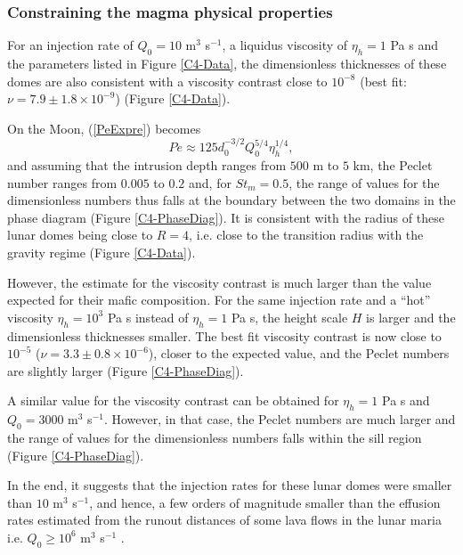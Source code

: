 \subsubsection*{Constraining the magma physical properties}
\label{C4-sec:constr-magma-phys}

For  an  injection  rate  of $Q_0=10$  m$^{3}$  s$^{-1}$,  a  liquidus
viscosity of  $\eta_h= 1$  Pa s  and the  parameters listed  in Figure
\ref{C4-Data},  the dimensionless  thicknesses of  these domes  are also
consistent with  a viscosity  contrast close  to $10^{-8}$  (best fit:
$\nu=7.9 \pm 1.8 \times 10^{-9}$) (Figure \ref{C4-Data}).  

On the Moon, (\ref{PeExpre}) becomes
\begin{equation}
  Pe \approx 125 d_0^{-3/2} Q_0^{5/4}\eta_h^{1/4},
  \label{PeExpreMoon}
\end{equation}
and assuming that  the intrusion depth ranges from $500$  m to $5$ km,
the Peclet  number ranges from  $0.005$ to $0.2$ and,  for $St_m=0.5$,
the range  of values for the  dimensionless numbers thus falls  at the
boundary  between  the  two  domains  in  the  phase  diagram  (Figure
\ref{C4-PhaseDiag}).  It is consistent with  the radius of these lunar
domes being close to $R=4$, i.e.   close to the transition radius with
the gravity regime (Figure \ref{C4-Data}).  

However, the estimate  for the viscosity contrast is  much larger than
the  value  expected  for  their  mafic  composition.   For  the  same
injection rate and  a ``hot'' viscosity $\eta_h=10^3$ Pa  s instead of
$\eta_h=1$ Pa s, the height scale  $H$ is larger and the dimensionless
thicknesses smaller.  The best  fit viscosity contrast  is now  close to
$10^{-5}$ ($\nu = 3.3 \pm  0.8 \times10^{-6}$), closer to the expected
value,   and  the   Peclet   numbers  are   slightly  larger   (Figure
\ref{C4-PhaseDiag}).  

A  similar  value for  the  viscosity  contrast  can be  obtained  for
$\eta_h=1$ Pa s and $Q_0=3000$ m$^3$ s$^{-1}$.  However, in that case,
the Peclet  numbers are much  larger and the  range of values  for the
dimensionless   numbers  falls   within   the   sill  region   (Figure
\ref{C4-PhaseDiag}).

In the end, it suggests that the injection rates for these lunar domes
were smaller  than $10$ m$^{3}$ s$^{-1}$,  and hence, a few  orders of
magnitude smaller  than the effusion  rates estimated from  the runout
distances of  some lava flows in  the lunar maria i.e.   $Q_0\ge 10^6$
m$^3$ s$^{-1}$ \citep{TracyKPGregg:1996wp}.

